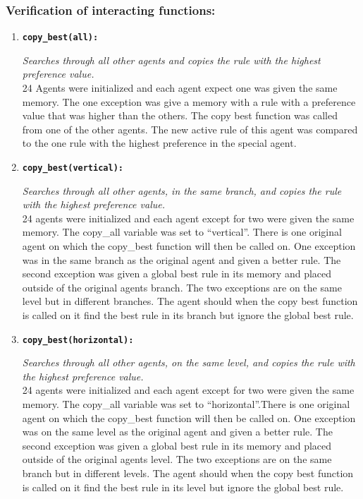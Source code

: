 \documentclass[a4paper]{article}
\begin{document}
\subsubsection{Verification of interacting functions:}
\begin{enumerate}
 \item \begin{alltt}\textbf{copy_best(all):}\end{alltt}
 \textit{Searches through all other agents and copies the rule with the highest preference value.} \\
 24 Agents were initialized and each agent expect one was given the same memory. The one exception
 was give a memory with a rule with a preference value that was higher than the others. The copy best 
 function was called from one of the other agents. The new active rule of this agent was compared to the 
 one rule with the highest preference in the special agent. 
 
 \item \begin{alltt}\textbf{copy_best(vertical):}\end{alltt}
 \textit{Searches through all other agents, in the same branch,  and copies the rule with the highest preference value.}\\
 24 agents were initialized and each agent except for two were given the same memory. The copy\_all 
 variable was set to “vertical”. There is one original agent on which the copy\_best function will then 
 be called on. One exception was in the same branch as the original agent and  given a better rule. 
 The second exception was given a global best rule in its memory and placed outside of the original 
 agents branch. The two exceptions are on the same level but in different branches.  The agent should when
 the copy best function is called on it find the best rule in its branch but ignore the global best rule. 
 
 \item \begin{alltt}\textbf{copy_best(horizontal):}\end{alltt}
 \textit{Searches through all other agents, on the same level,  and copies the rule with the highest preference value.}\\
 24 agents were initialized and each agent except for two were given the same memory. The copy\_all 
 variable was set to “horizontal”.There is one original agent on which the copy\_best function will then 
 be called on. One exception was on the same level as the original agent and  given a better rule. The second
 exception was given a global best rule in its memory and placed outside of the original agents level. The 
 two exceptions are on the same branch but in different levels.  The agent should when the copy best function 
 is called on it find the best rule in its level but ignore the global best rule. 
 

\end{enumerate}
\end{document}
